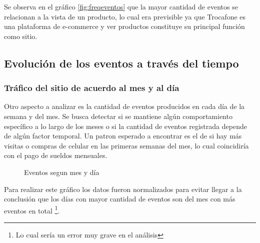 \documentclass[a4paper]{article}
\begin{document}
Se observa en el gráfico \ref{fig:freqeventos} que la mayor cantidad de eventos se relacionan a la vista de un producto, lo cual era previsible ya que Trocafone es una plataforma de e-commerce y ver productos constituye su principal función como sitio.

\subsection{Evolución de los eventos a través del tiempo}

\subsubsection{Tráfico del sitio de acuerdo al mes y al día}

Otro aspecto a analizar es la cantidad de eventos producidos en cada día de la semana y del mes. Se busca detectar si se mantiene algún comportamiento específico a lo largo de los meses o si la cantidad de eventos registrada depende de algún factor temporal. Un patron esperado a encontrar es el de si hay más visitas o compras de celular en las primeras semanas del mes, lo cual coincidiría con el pago de sueldos mensuales.

\begin{figure}[h!]
	\caption{Eventos segun mes y día}
	\label{fig:mesdiasnormalizado}
\end{figure}

Para realizar este gráfico los datos fueron normalizados para evitar llegar a la conclusión que los días con mayor cantidad de eventos son del mes con más eventos en total \footnote{Lo cual sería un error muy grave en el análisis}. 
\end{document}
